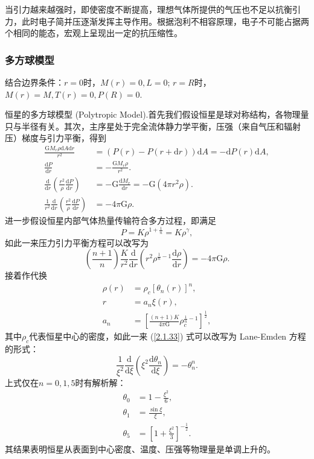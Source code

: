\documentclass[../天体物理基础.tex]{subfiles}
\begin{document}
当引力越来越强时，即使密度不断提高，理想气体所提供的气压也不足以抗衡引力，此时电子简并压逐渐发挥主导作用。根据泡利不相容原理，电子不可能占据两个相同的能态，宏观上呈现出一定的抗压缩性。

\subsubsection{多方球模型}
结合边界条件：$r=0$时，$M\left(r\right)=0,L=0$; $r=R$时，$M\left(r\right)=M,T\left(r\right)=0,P\left(R\right)=0$.

恒星的多方球模型 (Polytropic Model).首先我们假设恒星是球对称结构，各物理量只与半径有关。其次，主序星处于完全流体静力学平衡，压强（来自气压和辐射压）梯度与引力平衡，得到
\begin{align}
\frac{\mathrm{G}M_{r}\rho\mathrm{d}A\mathrm{d}r}{r^{2}}&=\left(P\left(r\right)-P\left(r+\mathrm{d}r\right)\right)\mathrm{d}A=-\mathrm{d}P\left(r\right)\mathrm{d}A,\\
\frac{\mathrm{d}P}{\mathrm{d}r}&=-\frac{\mathrm{G}M_{r}\rho}{r^{2}}.\\
\frac{\mathrm{d}}{\mathrm{d}r}\left(\frac{r^{2}}{\rho}\frac{\mathrm{d}P}{\mathrm{d}r}\right)&=-\mathrm{G}\frac{\mathrm{d}M_{r}}{\mathrm{d}r}=-\mathrm{G}\left(4\pi r^{2}\rho\right).\\
\frac{1}{r^{2}}\frac{\mathrm{d}}{\mathrm{d}r}\left(\frac{r^{2}}{\rho}\frac{\mathrm{d}P}{\mathrm{d}r}\right)&=-4\pi{}\mathrm{G}\rho.
\end{align}
进一步假设恒星内部气体热量传输符合多方过程，即满足
\begin{equation}
P=K\rho^{1+\frac{1}{n}}=K\rho^{\gamma},
\end{equation}
如此一来压力引力平衡方程可以改写为
\begin{equation}
\left(\frac{n+1}{n}\right)\frac{K}{r^{2}}\frac{\mathrm{d}}{\mathrm{d}r}\left(r^{2}\rho^{\frac{1}{n}-1}\frac{\mathrm{d}\rho}{\mathrm{d}r}\right)=-4\pi\mathrm{G}\rho.\label{2.1.33}
\end{equation}
接着作代换
\begin{align}
\rho\left(r\right)&=\rho_{c}\left[\theta_{n}\left(r\right)\right]^{n},\\
r&=a_{n}\xi\left(r\right),\\
a_{n}&=\left[\frac{\left(n+1\right)K}{4\pi\mathrm{G}}\rho_{c}^{\frac{1}{n}-1}\right]^{\frac{1}{2}},
\end{align}
其中$\rho_{c}$代表恒星中心的密度，如此一来 (\ref{2.1.33}) 式可以改写为 Lane-Emden 方程的形式：
\begin{equation}
\frac{1}{\xi^{2}}\frac{\mathrm{d}}{\mathrm{d}\xi}\left(\xi^{2}\frac{\mathrm{d}\theta_{n}}{\mathrm{d}\xi}\right)=-\theta_{n}^{n}.
\end{equation}
上式仅在$n=0,1,5$时有解析解：
\begin{align}
\theta_{0}&=1-\frac{\xi^{2}}{6},\\
\theta_{1}&=\frac{\sin\xi}{\xi},\\
\theta_{5}&=\left[1+\frac{\xi^{2}}{3}\right]^{-\frac{1}{2}}.
\end{align}
其结果表明恒星从表面到中心密度、温度、压强等物理量是单调上升的。
\end{document}
